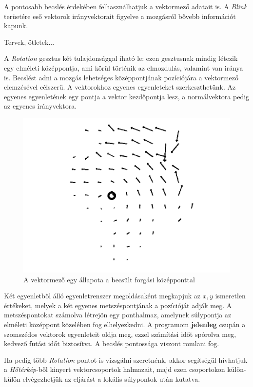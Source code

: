 A pontosabb becslés érdekében felhasználhatjuk a vektormező adatait is. A \textit{Blink} terüetére eső vektorok irányvektorait figyelve a mozgásról bővebb információt kapunk.

Tervek, ötletek...


A \textit{Rotation} gesztus két tulajdonsággal íható le: ezen gesztusnak mindig létezik egy elméleti középpontja, ami körül történik az elmozdulás, valamint van iránya is.
Becslést adni a mozgás lehetséges középpontjának pozíciójára a vektormező elemzésével célszerű.
A vektorokhoz egyenes egyenleteket szerkeszthetünk. Az egyenes egyenletének egy pontja a vektor kezdőpontja lesz, a normálvektora pedig az egyenes irányvektora.

\begin{figure}[h]
\centering
\includegraphics[width=11.2truecm, height=6.3truecm]{images/swirl_screenshot.png}
\caption{A vektormező egy állapota a becsült forgási középponttal}
\label{fig:rotation}
\end{figure}

Két egyenletből álló egyenletrenszer megoldásaként megkapjuk az $x,y$ ismeretlen értékeket, melyek a két egyenes metszéspontjának a pozícióját adják meg.
A metszéspontokat számolva létrejön egy ponthalmaz, amelynek súlypontja az elméleti középpont közelében fog elhelyezkedni.
A programom \textbf{jelenleg} csupán a szomszédos vektorok egyenleteit oldja meg, ezzel számítási időt spórolva meg, kedvező futási időt biztosítva. A becslés pontossága viszont romlani fog.

Ha pedig több \textit{Rotation} pontot is vizsgálni szeretnénk, akkor segítségül hívhatjuk a \textit{Hőtérkép}-ből kinyert vektorcsoportok halmazait, majd ezen csoportokon külön-külön elvégezhetjük az eljárást a lokális súlypontok után kutatva.

